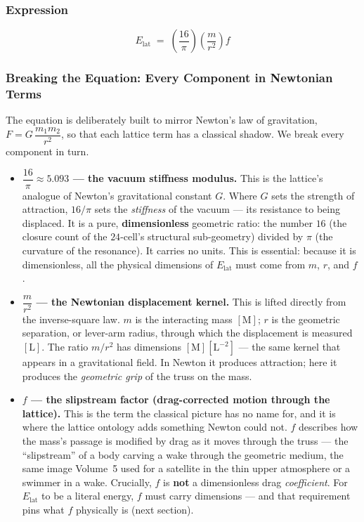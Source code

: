 \documentclass[12pt,oneside]{book}
\begin{document}
\subsubsection{Expression}
\[
\boxed{\;E_{\mathrm{lat}} \;=\; \left(\frac{16}{\pi}\right)\left(\frac{m}{r^{2}}\right) f\;}
\]
 
\subsubsection{Breaking the Equation: Every Component in Newtonian Terms}
 
The equation is deliberately built to mirror Newton's law of gravitation,
$F = G\,\dfrac{m_1 m_2}{r^{2}}$, so that each lattice term has a classical shadow. We
break every component in turn.
 
\begin{itemize}
  \item \textbf{$\dfrac{16}{\pi} \approx 5.093$ --- the vacuum stiffness modulus.}
  This is the lattice's analogue of Newton's gravitational constant $G$. Where $G$ sets
  the strength of attraction, $16/\pi$ sets the \emph{stiffness} of the vacuum --- its
  resistance to being displaced. It is a pure, \textbf{dimensionless} geometric ratio:
  the number $16$ (the closure count of the $24$-cell's structural sub-geometry) divided
  by $\pi$ (the curvature of the resonance). It carries no units. This is essential:
  because it is dimensionless, all the physical dimensions of $E_{\mathrm{lat}}$ must
  come from $m$, $r$, and $f$.
 
  \item \textbf{$\dfrac{m}{r^{2}}$ --- the Newtonian displacement kernel.}
  This is lifted directly from the inverse-square law. $m$ is the interacting mass
  $[\mathrm{M}]$; $r$ is the geometric separation, or lever-arm radius, through which the
  displacement is measured $[\mathrm{L}]$. The ratio $m/r^{2}$ has dimensions
  $[\mathrm{M}][\mathrm{L}^{-2}]$ --- the same kernel that appears in a gravitational
  field. In Newton it produces attraction; here it produces the \emph{geometric grip}
  of the truss on the mass.
 
  \item \textbf{$f$ --- the slipstream factor (drag-corrected motion through the lattice).}
  This is the term the classical picture has no name for, and it is where the lattice
  ontology adds something Newton could not. $f$ describes how the mass's passage is
  modified by drag as it moves through the truss --- the ``slipstream'' of a body
  carving a wake through the geometric medium, the same image Volume~5 used for a
  satellite in the thin upper atmosphere or a swimmer in a wake. Crucially, $f$ is
  \textbf{not} a dimensionless drag \emph{coefficient}. For $E_{\mathrm{lat}}$ to be a
  literal energy, $f$ must carry dimensions --- and that requirement pins what $f$
  physically is (next section).
\end{itemize}
 
\end{document}
